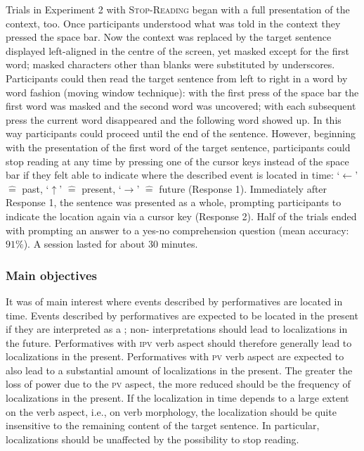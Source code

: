 \documentclass[output=paper,colorlinks,citecolor=brown,newtxmath,hidelinks]{langscibook}
\begin{document}
Trials in Experiment 2 with \textsc{Stop-Reading} began with a full presentation of the context, too. Once participants understood what was told in the context they pressed the space bar. Now the context was replaced by the target sentence displayed left-aligned in the centre of the screen, yet masked except for the first word; masked characters other than blanks were substituted by underscores. Participants could then read the target sentence from left to right in a word by word fashion (moving window technique): with the first press of the space bar the first word was masked and the second word was uncovered; with each subsequent press the current word disappeared and the following word showed up. In this way participants could proceed until the end of the sentence. However, beginning with the presentation of the first word of the target sentence, participants could stop reading at any time by pressing one of the cursor keys instead of the space bar if they felt able to indicate where the described event is located in time: ‘$\leftarrow$’ $\hat{=}$ past, ‘$\uparrow$’ $\hat{=}$ present, ‘$\rightarrow$’ $\hat{=}$ future (Response 1). Immediately after Response 1, the sentence was presented as a whole, prompting participants to indicate the location again via a cursor key (Response 2). Half of the trials ended with prompting an answer to a yes-no comprehension question (mean accuracy: $91\%$). A session lasted for about 30 minutes. 

\subsubsection{Main objectives}

It was of main interest where events described by performatives are located in time. Events described by performatives are expected to be located in the present if they are interpreted as a ; non- interpretations should lead to localizations in the future. Performatives with \textsc{ipv} verb aspect should therefore generally lead to localizations in the present. Performatives with \textsc{pv} verb aspect are expected to also lead to a substantial amount of localizations in the present. The greater the loss of  power due to the \textsc{pv} aspect, the more reduced should be the frequency of localizations in the present. If the localization in time depends to a large extent on the verb aspect, i.e., on verb morphology, the localization should be quite insensitive to the remaining content of the target sentence. In particular, localizations should be unaffected by the possibility to stop reading.
\end{document}
